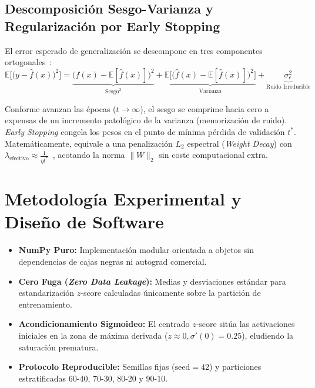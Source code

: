 \documentclass{article}
\begin{document}
\subsection{Descomposición Sesgo-Varianza y Regularización por Early Stopping}

El error esperado de generalización se descompone en tres componentes ortogonales~\cite{bishop2006}:
\begin{equation}
    \mathbb{E}\Big[\big(y - \hat{f}(x)\big)^2\Big] = \underbrace{\Big(f(x) - \mathbb{E}[\hat{f}(x)]\Big)^2}_{\text{Sesgo}^2} + \underbrace{\mathbb{E}\Big[\big(\hat{f}(x) - \mathbb{E}[\hat{f}(x)]\big)^2\Big]}_{\text{Varianza}} + \underbrace{\sigma_\epsilon^2}_{\text{Ruido Irreducible}} \label{eq:sesgo_varianza}
\end{equation}

Conforme avanzan las épocas ($t \to \infty$), el sesgo se comprime hacia cero a expensas de un incremento patológico de la varianza (memorización de ruido). \textit{Early Stopping} congela los pesos en el punto de mínima pérdida de validación $t^*$. Matemáticamente, equivale a una penalización $L_2$ espectral (\textit{Weight Decay}) con $\lambda_{\text{efectivo}} \approx \frac{1}{\eta t^*}$~\cite{goodfellow2016}, acotando la norma $\|W\|_2$ sin coste computacional extra.

\section{Metodología Experimental y Diseño de Software}
\label{sec:metodologia}

\begin{takeawaybox}
\begin{itemize}
    \item \textbf{NumPy Puro:} Implementación modular orientada a objetos sin dependencias de cajas negras ni autograd comercial.
    \item \textbf{Cero Fuga (\textit{Zero Data Leakage}):} Medias y desviaciones estándar para estandarización $z$-score calculadas únicamente sobre la partición de entrenamiento.
    \item \textbf{Acondicionamiento Sigmoideo:} El centrado $z$-score sitúa las activaciones iniciales en la zona de máxima derivada ($z \approx 0, \sigma'(0) = 0.25$), eludiendo la saturación prematura.
    \item \textbf{Protocolo Reproducible:} Semillas fijas ($\text{seed}=42$) y particiones estratificadas 60-40, 70-30, 80-20 y 90-10.
\end{itemize}
\end{takeawaybox}
\end{document}
